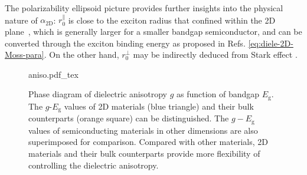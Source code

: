 The polarizability ellipsoid picture
provides further insights into the physical nature of
$\alpha_{\mathrm{2D}}$: $r_{0}^{\parallel}$ is close to the exciton
radius that confined within the 2D plane~\cite{Pulci_2014_exciton}, which is
generally larger for a smaller bandgap semiconductor, and can be
converted through the exciton binding energy as proposed in
Refs. \cite{Olsen_2016_hydrogen,Jiang_2017_Eg_Eb}
 \autoref{eq:diele-2D-Moss-para}. On the other hand, $r_{0}^{\perp}$ may be
indirectly deduced from Stark effect
\cite{Pedersen_2016_shark_effect_TMDC,Klein_2016_stark_eff,Roch_2018_stark_eff}.

\begin{figure}[!htbp]
  \centering
  {aniso.pdf_tex}
  \caption{Phase diagram of dielectric anisotropy $g$ as function of
    bandgap $E_{\mathrm{g}}$. The $g$-$E_{\mathrm{g}}$ values of 2D
    materials (blue triangle) and their bulk counterparts (orange
    square) can be distinguished. The $g-E_{\mathrm{g}}$
    values of semiconducting materials in other dimensions are also
    superimposed for comparison.
    Compared with other materials,
    2D materials and their bulk counterparts provide more flexibility
    of controlling the dielectric anisotropy.}
  \label{fig:diele-aniso}
\end{figure}

